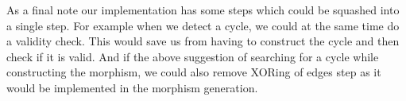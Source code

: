 \documentclass{article}
\begin{document}
As a final note our implementation has some steps which could be squashed into a single step. For example when we detect a cycle, we could at the same time do a validity check. This would save us from having to construct the cycle and then check if it is valid. And if the above suggestion of searching for a cycle while constructing the morphism, we could also remove XORing of edges step as it would be implemented in the morphism generation.
\end{document}
